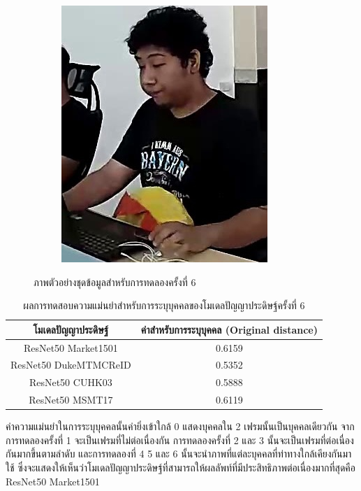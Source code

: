 \begin{figure}[!ht]
\begin{subfigure}[b]{0.2\textwidth}
        \label{fig:ex_5}
    \end{subfigure}
    \begin{subfigure}[b]{0.2\textwidth}
        \centering
        \includegraphics[width=\textwidth]{chapter4/images/o_4.jpg}
        \label{fig:ex_6}
    \end{subfigure}
    \caption{ภาพตัวอย่างชุดข้อมูลสำหรับการทดลองครั้งที่ 6}
    \label{fig: ภาพตัวอย่างชุดข้อมูลสำหรับการทดลอง 6}
\end{figure}
\begin{table}[!ht]
    \centering
    \begin{tabular}{|c|c|}
		\hline
		{โมเดลปัญญาประดิษฐ์}&{ค่าสำหรับการระบุบุคคล (Original distance)}							\\
		\hline
		ResNet50 Market1501	 			& 0.6159								\\
		ResNet50 DukeMTMCReID			& 0.5352								\\
		ResNet50 CUHK03				& 0.5888								\\
		ResNet50 MSMT17				& 0.6119								\\
	\hline
    \end{tabular}
    \caption{ผลการทดสอบความแม่นยำสำหรับการระบุบุคคลของโมเดลปัญญาประดิษฐ์ครั้งที่ 6}
    \label{tab: Original distant of image 6}
\end{table}

ค่าความแม่นยำในการระบุบุคคลนั้นค่ายิ่งเข้าใกล้ 0 แสดงบุคคลใน 2 เฟรมนั้นเป็นบุคคลเดียวกัน จากการทดลองครั้งที่ 1 จะเป็นเฟรมที่ไม่ต่อเนื่องกัน การทดลองครั้งที่ 2 และ 3 นั้นจะเป็นเฟรมที่ต่อเนื่องกันมากขึ้นตามลำดับ และการทดลองที่ 4 5 และ 6 นั้นจะนำภาพที่แต่ละบุคคลที่ท่าทางใกล้เคียงกันมาใช้ ซึ่งจะแสดงให้เห็นว่าโมเดลปัญญาประดิษฐ์ที่สามารถให้ผลลัพท์ที่มีประสิทธิภาพต่อเนื่องมากที่สุดคือ ResNet50 Market1501
